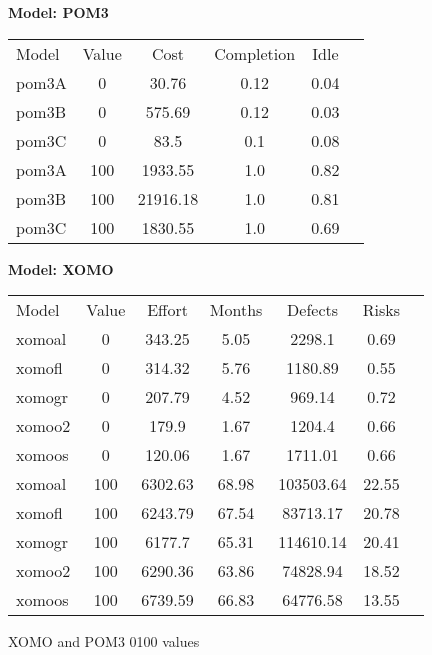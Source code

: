 \documentclass[11pt,twocolumn]{article}
\begin{document}
\begin{figure}[!t]

{\scriptsize
{\bf Model: POM3}

{\scriptsize \begin{tabular}{l@{~~~}c@{~~~}c@{~~~}c@{~~~}c@{~~~}c}
\arrayrulecolor{darkgray}
\rowcolor[gray]{.7}  Model & Value & Cost & Completion & Idle \\ 
pom3A & 0 & 30.76 & 0.12 & 0.04  \\
pom3B & 0 & 575.69 & 0.12 & 0.03  \\
pom3C & 0 & 83.5 & 0.1 & 0.08  \\
pom3A & 100 & 1933.55 & 1.0 & 0.82  \\
pom3B & 100 & 21916.18 & 1.0 & 0.81  \\
pom3C & 100 & 1830.55 & 1.0 & 0.69  \\ 
\end{tabular}}
}

{\scriptsize
{\bf Model: XOMO}

{\scriptsize \begin{tabular}{l@{~~~}c@{~~~}c@{~~~}c@{~~~}c@{~~~}c@{~~~}c}
\arrayrulecolor{darkgray}
\rowcolor[gray]{.7} Model & Value & Effort & Months & Defects & Risks \\ 
xomoal & 0 & 343.25 & 5.05 & 2298.1 & 0.69  \\
xomofl & 0 & 314.32 & 5.76 & 1180.89 & 0.55  \\
xomogr & 0 & 207.79 & 4.52 & 969.14 & 0.72  \\
xomoo2 & 0 & 179.9 & 1.67 & 1204.4 & 0.66  \\
xomoos & 0 & 120.06 & 1.67 & 1711.01 & 0.66  \\
xomoal & 100 & 6302.63 & 68.98 & 103503.64 & 22.55  \\
xomofl & 100 & 6243.79 & 67.54 & 83713.17 & 20.78  \\
xomogr & 100 & 6177.7 & 65.31 & 114610.14 & 20.41  \\
xomoo2 & 100 & 6290.36 & 63.86 & 74828.94 & 18.52  \\
xomoos & 100 & 6739.59 & 66.83 & 64776.58 & 13.55  \\ 
\end{tabular}}
}
\caption{XOMO and POM3 0100 values}\label{fig:xomopom100}
\end{figure}
\end{document}
